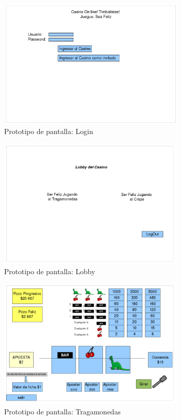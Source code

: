 


	\begin{figure}[p!hbt]
		\centering
		\includegraphics[width=0.8\textwidth]{../img/PP_Login.png}
		\caption{Prototipo de pantalla: Login }
		\label{fig:login}
	\end{figure}


        \begin{figure}[p!hbt]

		\centering
		\includegraphics[width=0.8\textwidth]{../img/PP_Lobby.png}
		\caption{Prototipo de pantalla: Lobby }
		\label{fig:lobby}
	\end{figure}

	\begin{figure}[p!hbt]
		\centering
		\includegraphics[width=0.8\textwidth]{../img/PP_Traga.png}
		\caption{Prototipo de pantalla: Tragamonedas }
		\label{fig:traga}
	\end{figure}

